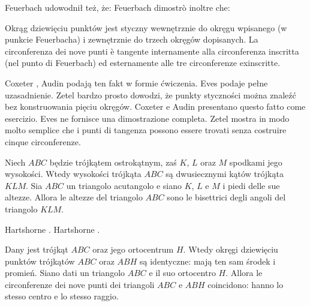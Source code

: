 Feuerbach udowodnił też, że: %
Feuerbach dimostrò inoltre che: %

\begin{theorem}
[Feuerbacha] %
[di Feuerbach] %
\label{punkt_feuerbacha}%
    Okrąg dziewięciu punktów jest styczny wewnętrznie do okręgu wpisanego (w punkcie Feuerbacha) i zewnętrznie do trzech okręgów dopisanych. %
    La circonferenza dei nove punti è tangente internamente alla circonferenza inscritta (nel punto di Feuerbach) ed esternamente alle tre circonferenze exinscritte. %
    
\end{theorem}

Coxeter \cite[s. 99]{coxeter_1967}, Audin \cite[s. 110]{audin_2003} podają ten fakt w formie ćwiczenia. Eves \cite[s. 133]{eves1_1972} podaje pełne uzasadnienie. Zetel \cite[s. 70]{zetel_2020} bardzo prosto dowodzi, że punkty styczności można znaleźć bez konstruowania pięciu okręgów. %
Coxeter \cite[p. 99]{coxeter_1967} e Audin \cite[p. 110]{audin_2003} presentano questo fatto come esercizio. Eves \cite[p. 133]{eves1_1972} ne fornisce una dimostrazione completa. Zetel \cite[p. 70]{zetel_2020} mostra in modo molto semplice che i punti di tangenza possono essere trovati senza costruire cinque circonferenze. %

\begin{proposition}
    \label{orthic_triangle}
    Niech $ABC$ będzie trójkątem ostrokątnym, zaś $K$, $L$ oraz $M$ spodkami jego wysokości. %
    Wtedy wysokości trójkąta $ABC$ są dwusiecznymi kątów trójkąta $KLM$. %
    Sia $ABC$ un triangolo acutangolo e siano $K$, $L$ e $M$ i piedi delle sue altezze. %
    Allora le altezze del triangolo $ABC$ sono le bisettrici degli angoli del triangolo $KLM$. %
\end{proposition}

Hartshorne \cite[s. 58]{hartshorne_2000}. %
Hartshorne \cite[p. 58]{hartshorne_2000}. %

\begin{theorem}[Hamiltona]
    Dany jest trójkąt $ABC$ oraz jego ortocentrum $H$. %
    Wtedy okręgi dziewięciu punktów trójkątów $ABC$ oraz $ABH$ są identyczne: mają ten sam środek i promień. %
    Siano dati un triangolo $ABC$ e il suo ortocentro $H$. %
    Allora le circonferenze dei nove punti dei triangoli $ABC$ e $ABH$ coincidono: hanno lo stesso centro e lo stesso raggio. %
\end{theorem}

